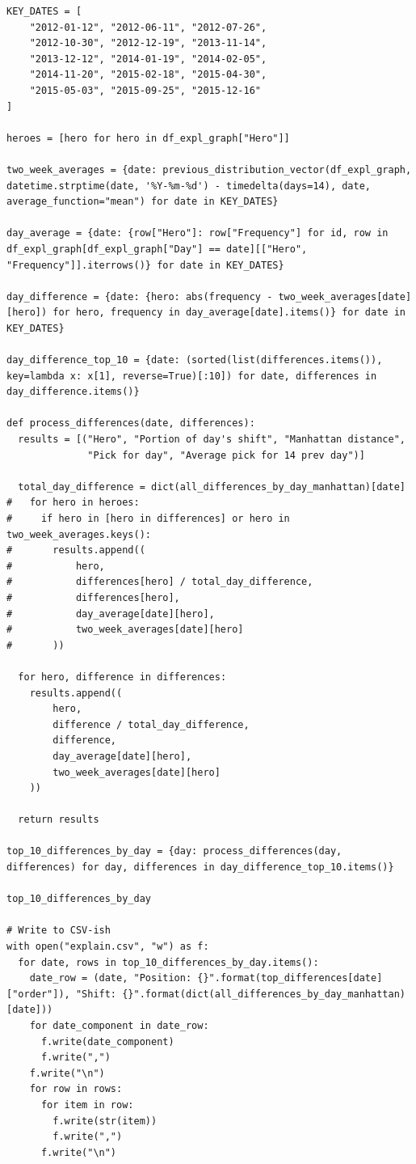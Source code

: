 \begin{verbatim}
KEY_DATES = [
    "2012-01-12", "2012-06-11", "2012-07-26", 
    "2012-10-30", "2012-12-19", "2013-11-14", 
    "2013-12-12", "2014-01-19", "2014-02-05", 
    "2014-11-20", "2015-02-18", "2015-04-30", 
    "2015-05-03", "2015-09-25", "2015-12-16"
]

heroes = [hero for hero in df_expl_graph["Hero"]]

two_week_averages = {date: previous_distribution_vector(df_expl_graph, datetime.strptime(date, '%Y-%m-%d') - timedelta(days=14), date, average_function="mean") for date in KEY_DATES}

day_average = {date: {row["Hero"]: row["Frequency"] for id, row in df_expl_graph[df_expl_graph["Day"] == date][["Hero", "Frequency"]].iterrows()} for date in KEY_DATES}

day_difference = {date: {hero: abs(frequency - two_week_averages[date][hero]) for hero, frequency in day_average[date].items()} for date in KEY_DATES}

day_difference_top_10 = {date: (sorted(list(differences.items()), key=lambda x: x[1], reverse=True)[:10]) for date, differences in day_difference.items()}

def process_differences(date, differences):
  results = [("Hero", "Portion of day's shift", "Manhattan distance",
              "Pick for day", "Average pick for 14 prev day")]
  
  total_day_difference = dict(all_differences_by_day_manhattan)[date]
#   for hero in heroes:
#     if hero in [hero in differences] or hero in two_week_averages.keys():
#       results.append((
#           hero,
#           differences[hero] / total_day_difference,
#           differences[hero],
#           day_average[date][hero],
#           two_week_averages[date][hero]
#       ))
  
  for hero, difference in differences:
    results.append((
        hero,
        difference / total_day_difference,
        difference,
        day_average[date][hero],
        two_week_averages[date][hero]
    ))
  
  return results
  
top_10_differences_by_day = {day: process_differences(day, differences) for day, differences in day_difference_top_10.items()}

top_10_differences_by_day

# Write to CSV-ish
with open("explain.csv", "w") as f:
  for date, rows in top_10_differences_by_day.items():
    date_row = (date, "Position: {}".format(top_differences[date]["order"]), "Shift: {}".format(dict(all_differences_by_day_manhattan)[date]))
    for date_component in date_row:
      f.write(date_component)
      f.write(",")
    f.write("\n")
    for row in rows:
      for item in row:
        f.write(str(item))
        f.write(",")
      f.write("\n")
\end{verbatim}


